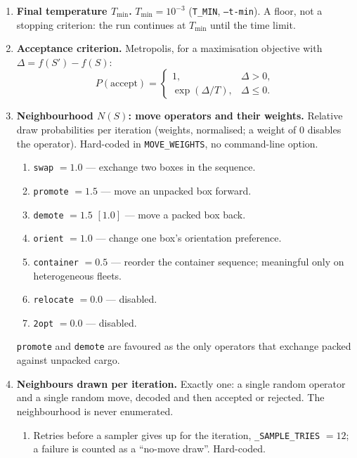 \begin{enumerate}
  \item \textbf{Final temperature $T_{\min}$.}
        $T_{\min} = 10^{-3}$ (\texttt{T\_MIN}, \texttt{--t-min}). A floor, not
        a stopping criterion: the run continues at $T_{\min}$ until the time
        limit.

  \item \textbf{Acceptance criterion.}
        Metropolis, for a maximisation objective with
        $\Delta = f(S') - f(S)$:
        \[
          P(\text{accept}) =
          \begin{cases}
            1, & \Delta > 0,\\[2pt]
            \exp(\Delta / T), & \Delta \le 0 .
          \end{cases}
        \]

  \item \textbf{Neighbourhood $N(S)$: move operators and their weights.}
        Relative draw probabilities per iteration (weights, normalised; a
        weight of $0$ disables the operator). Hard-coded in
        \texttt{MOVE\_WEIGHTS}, no command-line option.
        \begin{enumerate}
          \item \texttt{swap} $= 1.0$ --- exchange two boxes in the sequence.
          \item \texttt{promote} $= 1.5$ --- move an unpacked box forward.
          \item \texttt{demote} $= 1.5$ $[1.0]$ --- move a packed box back.
          \item \texttt{orient} $= 1.0$ --- change one box's orientation
                preference.
          \item \texttt{container} $= 0.5$ --- reorder the container sequence;
                meaningful only on heterogeneous fleets.
          \item \texttt{relocate} $= 0.0$ --- disabled.
          \item \texttt{2opt} $= 0.0$ --- disabled.
        \end{enumerate}
        \texttt{promote} and \texttt{demote} are favoured as the only
        operators that exchange packed against unpacked cargo.

  \item \textbf{Neighbours drawn per iteration.}
        Exactly one: a single random operator and a single random move, decoded
        and then accepted or rejected. The neighbourhood is never enumerated.
        \begin{enumerate}
          \item Retries before a sampler gives up for the iteration,
                \texttt{\_SAMPLE\_TRIES} $= 12$; a failure is counted as a
                ``no-move draw''. Hard-coded.
        \end{enumerate}


\end{enumerate}
